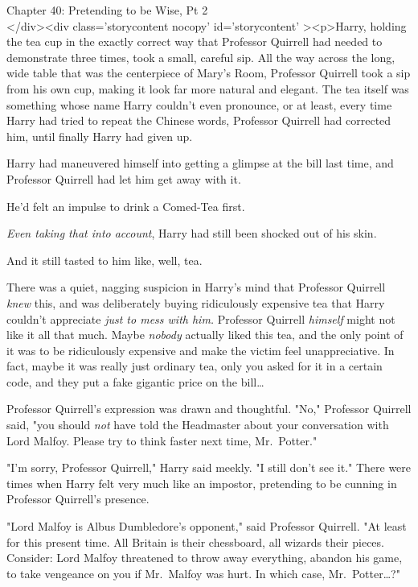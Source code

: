 
Chapter 40: Pretending to be Wise, Pt 2\\
</div><div  class='storycontent nocopy' id='storycontent' ><p>Harry, holding the tea cup in the exactly correct way that Professor Quirrell had needed to demonstrate three times, took a small, careful sip. All the way across the long, wide table that was the centerpiece of Mary's Room, Professor Quirrell took a sip from his own cup, making it look far more natural and elegant. The tea itself was something whose name Harry couldn't even pronounce, or at least, every time Harry had tried to repeat the Chinese words, Professor Quirrell had corrected him, until finally Harry had given up.

Harry had maneuvered himself into getting a glimpse at the bill last time, and Professor Quirrell had let him get away with it.

He'd felt an impulse to drink a Comed-Tea first.

\emph{Even taking that into account}, Harry had still been shocked out of his skin.

And it still tasted to him like, well, tea.

There was a quiet, nagging suspicion in Harry's mind that Professor Quirrell \emph{knew} this, and was deliberately buying ridiculously expensive tea that Harry couldn't appreciate \emph{just to mess with him.} Professor Quirrell \emph{himself} might not like it all that much. Maybe \emph{nobody} actually liked this tea, and the only point of it was to be ridiculously expensive and make the victim feel unappreciative. In fact, maybe it was really just ordinary tea, only you asked for it in a certain code, and they put a fake gigantic price on the bill{\ldots}

Professor Quirrell's expression was drawn and thoughtful. "No," Professor Quirrell said, "you should \emph{not} have told the Headmaster about your conversation with Lord Malfoy. Please try to think faster next time, Mr.~Potter."

"I'm sorry, Professor Quirrell," Harry said meekly. "I still don't see it." There were times when Harry felt very much like an impostor, pretending to be cunning in Professor Quirrell's presence.

"Lord Malfoy is Albus Dumbledore's opponent," said Professor Quirrell. "At least for this present time. All Britain is their chessboard, all wizards their pieces. Consider: Lord Malfoy threatened to throw away everything, abandon his game, to take vengeance on you if Mr.~Malfoy was hurt. In which case, Mr.~Potter{\ldots}?"

